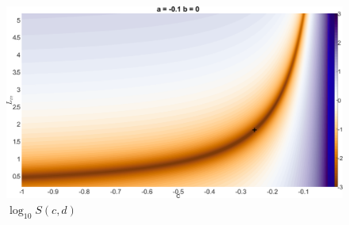 \documentclass{article}
\begin{document}
\begin{figure}[htbp]
		\centering \includegraphics[width = \textwidth]{leastsquarescd.png}
		\caption{$\log_{10}S(c,d)$}\label{fig:ScLm}
\end{figure}

\clearpage
\end{document}
